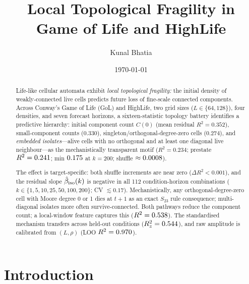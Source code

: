 \documentclass[aip,cha,preprint,nofootinbib]{revtex4-2}
\newcommand{\topCompCountR}{0.352}
\newcommand{\topSmallLeqFourR}{0.330}
\newcommand{\topSingletonR}{0.274}
\newcommand{\topIsoEmbeddedR}{0.234}
\newcommand{\iso}{{\rm iso}}
\newcommand{\biso}{\hat{\beta}_{\iso}}
\begin{document}
\title{Local Topological Fragility in Game of Life and HighLife}

\author{Kunal Bhatia}

\date{\today}

\begin{abstract}
Life-like cellular automata exhibit \emph{local topological fragility:}
the initial density of weakly-connected live cells predicts future loss of
fine-scale connected components.
Across Conway's Game of Life (GoL) and HighLife, two grid sizes
($L\in\{64,128\}$), four densities, and seven forecast horizons,
a sixteen-statistic topology battery identifies a predictive hierarchy:
initial component count $C(0)$ (mean residual $R^2 = \topCompCountR$),
small-component counts ($\topSmallLeqFourR$), singleton/orthogonal-degree-zero
cells ($\topSingletonR$), and \emph{embedded isolates}---alive cells with
no orthogonal and at least one diagonal live neighbour---as the
mechanistically transparent motif
($R^2 = \topIsoEmbeddedR$; prestate $R^2 = 0.241$;
min $0.175$ at $k=200$; shuffle $\approx0.0008$).

The effect is target-specific: both shuffle increments are near zero
($\Delta R^2 < 0.001$), and the residual slope $\biso(k)$ is negative
in all 112 condition-horizon combinations
($k\in\{1,5,10,25,50,100,200\}$; CV $\lesssim0.17$).
Mechanistically, any orthogonal-degree-zero cell with Moore degree 0 or 1
dies at $t{+}1$ as an exact $S_{23}$ rule consequence; multi-diagonal
isolates more often survive-connected.
Both pathways reduce the component count; a local-window feature captures
this ($R^2 = 0.538$).
The standardised mechanism transfers across held-out conditions
($R^2_z = 0.544$), and raw amplitude is calibrated from
$(L,\rho)$ (LOO $R^2 = 0.970$).
\end{abstract}


\maketitle

\section{Introduction}
\label{sec:intro}
\end{document}

